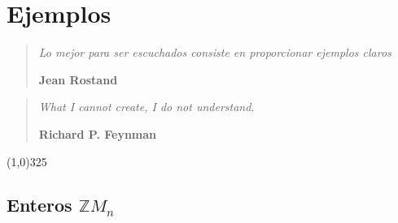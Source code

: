 \chapter{Ejemplos}

\begin{flushright}
  \begin{minipage}[t]{13cm}
    \begin{flushright}
      \begin{quote}
        \emph{
          Lo mejor para ser escuchados consiste en proporcionar ejemplos claros
        }
        \begin{flushright}
          \textbf{\textemdash Jean Rostand}
        \end{flushright}
      \end{quote}
    \end{flushright}
  \end{minipage}
\end{flushright}

\bigskip

\begin{flushright}
  \begin{minipage}[t]{13cm}
    \begin{flushright}
      \begin{quote}
        \emph{
          What I cannot create, I do not understand.
        }
        \begin{flushright}
          \textbf{\textemdash Richard P. Feynman}
        \end{flushright}
      \end{quote}
    \end{flushright}
  \end{minipage}
\end{flushright}


\begin{center}{\line(1,0){325}}\end{center}


 
\section{Enteros $\mathbb{Z}M_n$}\label{ejZM_n}

